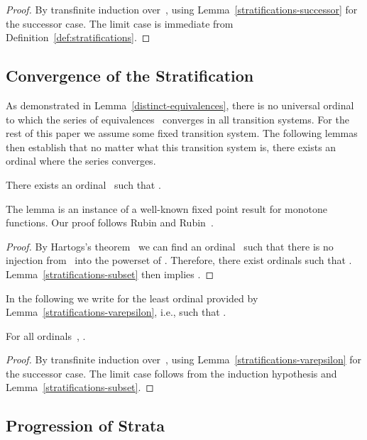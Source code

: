 \documentclass{CSML}
\theoremstyle{definition}
\begin{document}
\begin{proof}
By transfinite induction over~, using
Lemma~\ref{stratifications-successor} for the successor case.  The
limit case is immediate from Definition~\ref{def:stratifications}.
\end{proof}

\subsection{Convergence of the Stratification}

As demonstrated in Lemma~\ref{distinct-equivalences}, there is no
universal ordinal to which the series of equivalences~
converges in all transition systems.  For the rest of this paper we
assume some fixed transition system.  The following lemmas then
establish that no matter what this transition system is, there exists
an ordinal where the series converges.

\begin{lem}
\label{stratifications-varepsilon}
There exists an ordinal~ such that
.
\end{lem}

The lemma is an instance of a well-known fixed point result for
monotone functions.  Our proof follows Rubin and
Rubin~\cite{Rubin1963}.

\begin{proof}
By Hartogs's theorem~\cite{Hartogs1915} we can find an
ordinal~ such that there is no injection from~ into
the powerset of .  Therefore, there exist
ordinals  such that
.
Lemma~\ref{stratifications-subset} then implies
.
\end{proof}

In the following we write  for the least ordinal provided
by Lemma~\ref{stratifications-varepsilon}, i.e., such that
.

\begin{lem}
\label{stratifications-stable}
For all ordinals~, .
\end{lem}

\begin{proof}
By transfinite induction over~, using
Lemma~\ref{stratifications-varepsilon} for the successor case.  The
limit case follows from the induction hypothesis and
Lemma~\ref{stratifications-subset}.
\end{proof}

\subsection{Progression of Strata}
\end{document}
